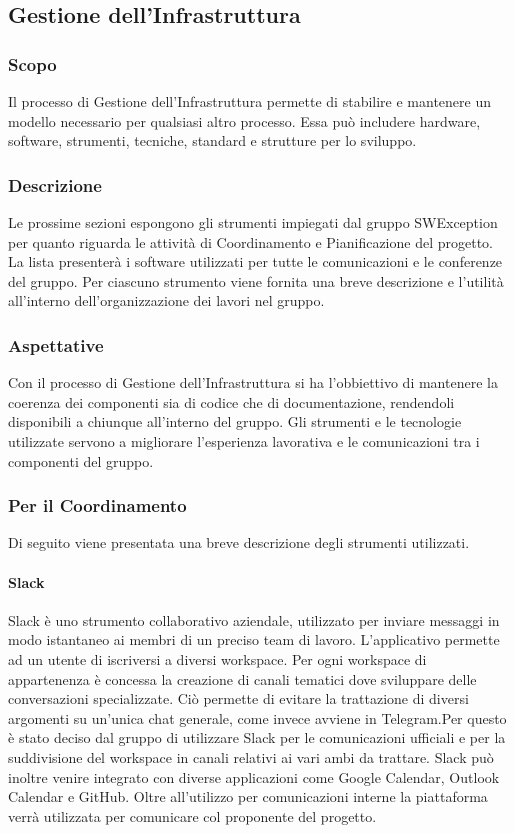 \subsection{Gestione dell'Infrastruttura} \label{_gestioneInfrastruttura}
\subsubsection{Scopo}
Il processo di Gestione dell’Infrastruttura permette di stabilire e mantenere un modello necessario per qualsiasi altro processo. Essa può includere hardware, software, strumenti, tecniche, standard e strutture per lo sviluppo.

\subsubsection{Descrizione}
Le prossime sezioni espongono gli strumenti impiegati dal gruppo SWException per quanto riguarda le attività di Coordinamento e Pianificazione del progetto. La lista presenterà i software utilizzati per tutte le comunicazioni e le conferenze del gruppo. Per ciascuno strumento viene fornita una breve descrizione e l'utilità all'interno dell'organizzazione dei lavori nel gruppo.

\subsubsection{Aspettative}
Con il processo di Gestione dell’Infrastruttura si ha l'obbiettivo di mantenere la coerenza dei componenti sia di codice che di documentazione, rendendoli disponibili a chiunque all'interno del gruppo. Gli strumenti e le tecnologie utilizzate servono a migliorare l'esperienza lavorativa e le comunicazioni tra i componenti del gruppo.


\subsubsection{Per il Coordinamento}
Di seguito viene presentata una breve descrizione degli strumenti utilizzati.

\paragraph{Slack}
Slack è uno strumento collaborativo aziendale, utilizzato per inviare messaggi in modo istantaneo ai membri di un preciso team di lavoro. L’applicativo permette ad un utente di iscriversi
a diversi workspace. Per ogni workspace di appartenenza è concessa la creazione di canali
tematici dove sviluppare delle conversazioni specializzate. Ciò permette di evitare la trattazione di diversi argomenti su un’unica chat generale, come invece avviene in Telegram.Per questo è stato deciso dal gruppo di utilizzare Slack per le comunicazioni ufficiali e per la suddivisione del workspace in canali relativi ai vari ambi da trattare. Slack può inoltre venire integrato con diverse applicazioni come Google Calendar, Outlook Calendar e GitHub. Oltre all'utilizzo per comunicazioni interne la piattaforma verrà utilizzata per comunicare col proponente del progetto.

